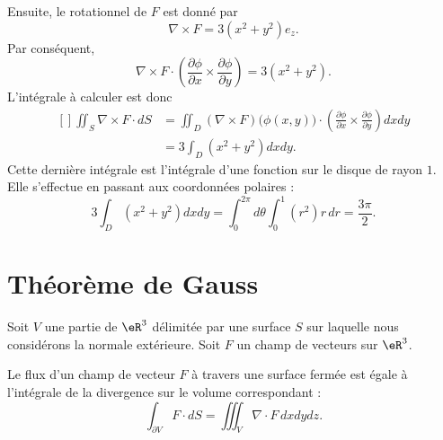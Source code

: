 \begin{example}
    Ensuite, le rotationnel de $F$ est donné par
    \begin{equation}
        \nabla\times F=3(x^2+y^2)e_z.
    \end{equation}
    Par conséquent,
    \begin{equation}
        \nabla\times F\cdot\left( \frac{ \partial \phi }{ \partial x }\times\frac{ \partial \phi }{ \partial y } \right)=3(x^2+y^2).
    \end{equation}
    L'intégrale à calculer est donc
    \begin{equation}
        \begin{aligned}[]
            \iint_S\nabla\times F\cdot dS&=\iint_D(\nabla\times F)\big( \phi(x,y) \big)\cdot\left( \frac{ \partial \phi }{ \partial x }\times\frac{ \partial \phi }{ \partial y } \right)dxdy\\
            &=3\int_D(x^2+y^2)dxdy.
        \end{aligned}
    \end{equation}
    Cette dernière intégrale est l'intégrale d'une fonction sur le disque de rayon $1$. Elle s'effectue en passant aux coordonnées polaires :
    \begin{equation}
        3\int_D(x^2+y^2)dxdy=\int_0^{2\pi}d\theta\int_0^1(r^2)r\,dr=\frac{ 3\pi }{2}.
    \end{equation}
\end{example}

\section{Théorème de Gauss}

Soit $V$ une partie de $\eR^3$ délimitée par une surface $S$ sur laquelle nous considérons la normale extérieure. Soit $F$ un champ de vecteurs sur $\eR^3$.

\begin{theorem}
    Le flux d'un champ de vecteur $F$ à travers une surface fermée est égale à l'intégrale de la divergence sur le volume correspondant :
    \begin{equation}
        \int_{\partial V} F\cdot dS=\iiint_V\nabla\cdot F\,dxdydz.
    \end{equation}
\end{theorem}

